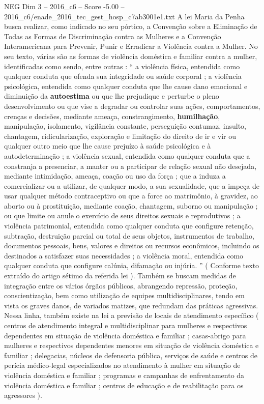 \begin{textsample}{NEG Dim 3 – 2016\_c6 – Score -5.00 – 2016\_c6/enade\_2016\_tec\_gest\_hosp\_c7ab3001e1.txt}
A lei Maria da Penha busca realizar, como indicado no seu pórtico, a Convenção sobre a Eliminação de Todas as Formas de Discriminação contra as Mulheres e a Convenção Interamericana para Prevenir, Punir e Erradicar a Violência contra a Mulher.
No seu texto, várias são as formas de violência doméstica e familiar contra a mulher, identificadas como sendo, entre outras : “ a violência física, entendida como qualquer conduta que ofenda sua integridade ou saúde corporal ; a violência psicológica, entendida como qualquer conduta que lhe cause dano emocional e diminuição da \textbf{autoestima} ou que lhe prejudique e perturbe o pleno desenvolvimento ou que vise a degradar ou controlar suas ações, comportamentos, crenças e decisões, mediante ameaça, constrangimento, \textbf{humilhação}, manipulação, isolamento, vigilância constante, perseguição contumaz, insulto, chantagem, ridicularização, exploração e limitação do direito de ir e vir ou qualquer outro meio que lhe cause prejuízo à saúde psicológica e à autodeterminação ; a violência sexual, entendida como qualquer conduta que a constranja a presenciar, a manter ou a participar de relação sexual não desejada, mediante intimidação, ameaça, coação ou uso da força ; que a induza a comercializar ou a utilizar, de qualquer modo, a sua sexualidade, que a impeça de usar qualquer método contraceptivo ou que a force ao matrimônio, à gravidez, ao aborto ou à prostituição, mediante coação, chantagem, suborno ou manipulação ; ou que limite ou anule o exercício de seus direitos sexuais e reprodutivos ; a violência patrimonial, entendida como qualquer conduta que configure retenção, subtração, destruição parcial ou total de seus objetos, instrumentos de trabalho, documentos pessoais, bens, valores e direitos ou recursos econômicos, incluindo os destinados a satisfazer suas necessidades ; a violência moral, entendida como qualquer conduta que configure calúnia, difamação ou injúria. ” ( Conforme texto extraído do artigo sétimo da referida lei ).
Também se buscam medidas de integração entre os vários órgãos públicos, abrangendo repressão, proteção, conscientização, bem como utilização de equipes multidisciplinares, tendo em vista os graves danos, de variados matizes, que redundam das práticas agressivas.
Nessa linha, também existe na lei a previsão de locais de atendimento específico ( centros de atendimento integral e multidisciplinar para mulheres e respectivos dependentes em situação de violência doméstica e familiar ; casas-abrigo para mulheres e respectivos dependentes menores em situação de violência doméstica e familiar ; delegacias, núcleos de defensoria pública, serviços de saúde e centros de perícia médico-legal especializados no atendimento à mulher em situação de violência doméstica e familiar ; programas e campanhas de enfrentamento da violência doméstica e familiar ; centros de educação e de reabilitação para os agressores ).

\end{textsample}
